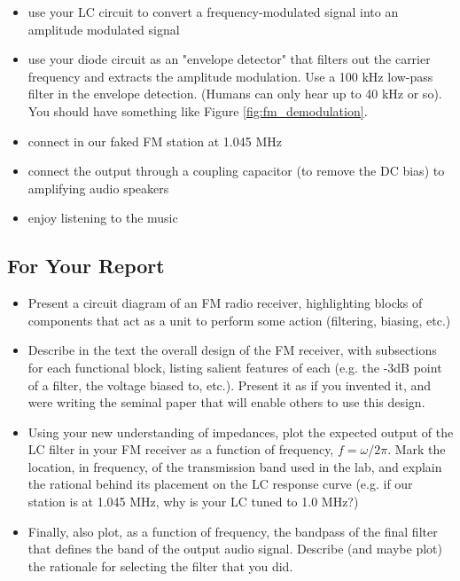 \documentclass[11pt]{article}
\begin{document}
\begin{itemize}[noitemsep,nolistsep]
\item use your LC circuit to convert a frequency-modulated signal into an amplitude modulated signal
\item use your diode circuit as an "envelope detector" that filters out the carrier frequency and extracts the
amplitude modulation.  Use a 100 kHz low-pass filter in the envelope detection. (Humans can only hear up to 40 kHz
or so).  You should have something like Figure \ref{fig:fm_demodulation}.
\item connect in our faked FM station at 1.045 MHz
\item connect the output through a coupling capacitor (to remove the DC bias) to amplifying audio speakers
\item enjoy listening to the music
\end{itemize}

\subsection{For Your Report}
\begin{itemize}[noitemsep,nolistsep]
\item Present a circuit diagram of an FM radio receiver, highlighting blocks 
of components that act as a unit to perform some action (filtering, biasing, etc.)
\item Describe in the text the overall design of the FM receiver, with subsections for each
functional block, listing salient features of each (e.g. the -3dB point of a filter,
the voltage biased to, etc.).  Present it as if you invented it, and were writing the seminal
paper that will enable others to use this design.
\item Using your new understanding of impedances, plot the expected output of the LC filter in
your FM receiver as a function of frequency, $f=\omega/2\pi$.  Mark the location, in frequency, 
of the transmission band used in the lab, and explain the rational behind its placement on the LC
response curve (e.g. if our station is at 1.045 MHz, why is your LC tuned to 1.0 MHz?)
\item Finally, also plot, as a function of frequency, the bandpass of the final filter that
defines the band of the output audio signal.  Describe (and maybe plot) the rationale for
selecting the filter that you did.
\end{itemize}
\end{document}
